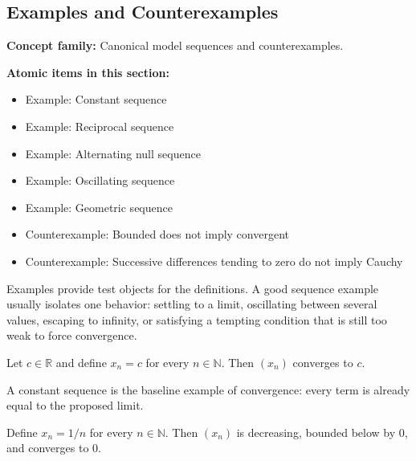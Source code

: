 \subsection*{Examples and Counterexamples}

\begin{tcolorbox}[colback=gray!8, colframe=gray!40, title=\textbf{Sequence Examples Toolkit}]
\textbf{Concept family:} Canonical model sequences and counterexamples.

\medskip
\textbf{Atomic items in this section:}
\begin{itemize}
  \item Example: Constant sequence
  \item Example: Reciprocal sequence
  \item Example: Alternating null sequence
  \item Example: Oscillating sequence
  \item Example: Geometric sequence
  \item Counterexample: Bounded does not imply convergent
  \item Counterexample: Successive differences tending to zero do not imply Cauchy
\end{itemize}
\end{tcolorbox}

\begin{exposition}
Examples provide test objects for the definitions. A good sequence example
usually isolates one behavior: settling to a limit, oscillating between
several values, escaping to infinity, or satisfying a tempting condition that
is still too weak to force convergence.
\end{exposition}

\begin{example}
\label{ex:sequence-example-constant}
Let $c\in\mathbb{R}$ and define $x_n=c$ for every $n\in\mathbb{N}$. Then
$(x_n)$ converges to $c$.
\end{example}

\begin{remark*}[Interpretation]
A constant sequence is the baseline example of convergence: every term is
already equal to the proposed limit.
\end{remark*}

\begin{example}
\label{ex:sequence-example-reciprocal}
Define $x_n=1/n$ for every $n\in\mathbb{N}$. Then $(x_n)$ is decreasing,
bounded below by $0$, and converges to $0$.
\end{example}


